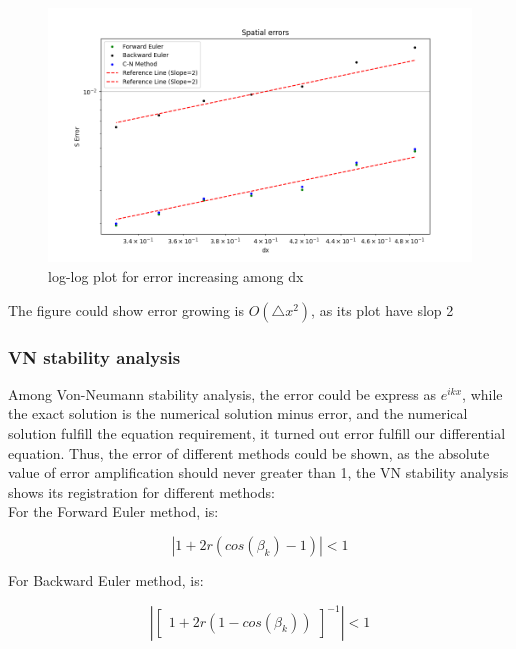 \documentclass[12pt]{article}
\begin{document}
\begin{figure}[H] 
\centering 
\includegraphics[scale=0.4]{Error growing.jpg} 
\caption{log-log plot for error increasing among dx} 
\label{TDMA Solver code} 
\end{figure}

The figure could show error growing is $O\left( \triangle x^{2}\right)  $, as its plot have slop 2





\subsubsection{VN stability analysis}

Among Von-Neumann stability analysis, the error could be express as $e^{ikx}$, while the exact solution is the numerical solution minus error, and the numerical solution fulfill the equation requirement, it turned out error fulfill our differential equation. Thus, the error of different methods could be shown, as the absolute value of error amplification should never greater than 1, the VN stability analysis shows its registration for different methods:\\

For the Forward Euler method, is:

$$ \left\vert 1+2r\left( cos\left( \beta_{k} \right)  -1\right)  \right\vert <1 $$

For Backward Euler method, is:

$$\left\vert \begin{bmatrix}1+2r\left( 1-cos\left( \beta_{k} \right)  \right)  \end{bmatrix}^{-1} \right\vert  <1$$\\
\end{document}
